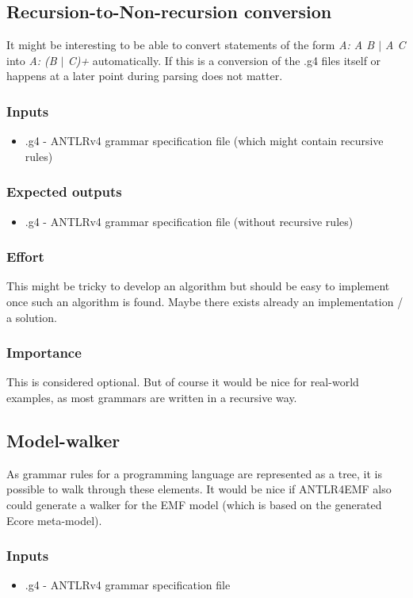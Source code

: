 \subsection{Recursion-to-Non-recursion conversion}
It might be interesting to be able to convert
statements of the form {\it A: A B $|$ A C}
into {\it A: (B $|$ C)+} automatically. 
If this is a conversion of the .g4 files itself
or happens at a later point during parsing does not
matter.
\subsubsection{Inputs}
\begin{itemize}
	\item .g4 - ANTLRv4 grammar specification file
	(which might contain recursive rules)
\end{itemize}
\subsubsection{Expected outputs}
\begin{itemize}
		\item .g4 - ANTLRv4 grammar specification file
		(without recursive rules)
\end{itemize}
\subsubsection{Effort}
This might be tricky to develop an algorithm but
should be easy to implement once such an algorithm is found.
Maybe there exists already an implementation / a solution.
\subsubsection{Importance}
This is considered optional. But of course it would be nice
for real-world examples, as most grammars are written in
a recursive way.

\subsection{Model-walker}
As grammar rules for a programming language
are represented as a tree, it is possible
to walk through these elements. It would be 
nice if ANTLR4EMF also could generate a
walker for the EMF model (which is based
on the generated Ecore meta-model).
\subsubsection{Inputs}
\begin{itemize}
	\item .g4 - ANTLRv4 grammar specification file
\end{itemize}
